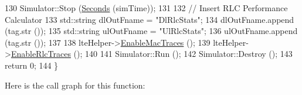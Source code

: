 \begin{DoxyCode}
130   Simulator::Stop (\hyperlink{group__timecivil_ga33c34b816f8ff6628e33d5c8e9713b9e}{Seconds} (simTime));
131 
132   \textcolor{comment}{// Insert RLC Performance Calculator}
133   std::string dlOutFname = \textcolor{stringliteral}{"DlRlcStats"};
134   dlOutFname.append (tag.str ());
135   std::string ulOutFname = \textcolor{stringliteral}{"UlRlcStats"};
136   ulOutFname.append (tag.str ());
137 
138   lteHelper->\hyperlink{classns3_1_1LteHelper_affa3a12841520407d3662417fe41863d}{EnableMacTraces} ();
139   lteHelper->\hyperlink{classns3_1_1LteHelper_abadfdd04d30b261e9b6f0846b4784928}{EnableRlcTraces} ();
140 
141   Simulator::Run ();
142   Simulator::Destroy ();
143   \textcolor{keywordflow}{return} 0;
144 \}
\end{DoxyCode}


Here is the call graph for this function\+:


